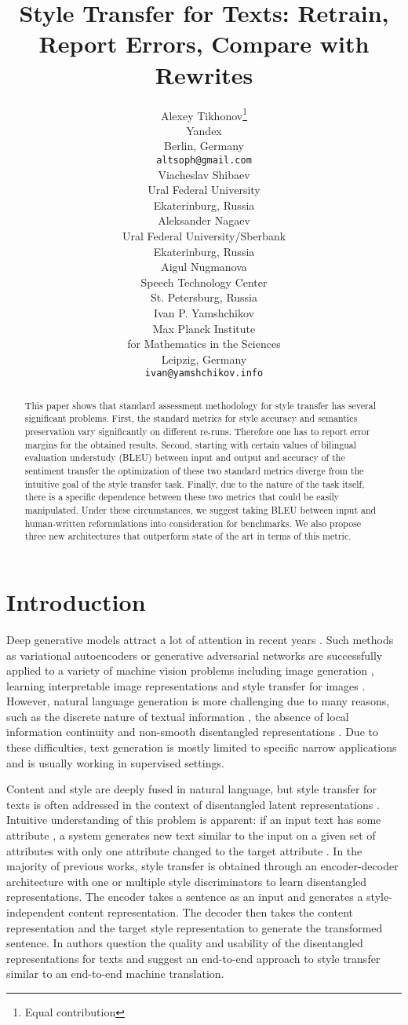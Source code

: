 \documentclass[11pt,a4paper]{article}
\title{Style Transfer for Texts: Retrain, Report Errors, Compare with Rewrites}
\author{Alexey Tikhonov\thanks{Equal contribution} \\
  Yandex \\
  Berlin, Germany \\
  \texttt{altsoph@gmail.com} \\\And
  Viacheslav Shibaev\footnotemark[1]  \\
  Ural Federal University \\
  Ekaterinburg, Russia \\\And
  Aleksander Nagaev  \\
  Ural Federal University/Sberbank \\
  Ekaterinburg, Russia \\\AND
  Aigul Nugmanova \\
  Speech Technology Center \\
  St. Petersburg, Russia \\\And
  Ivan P. Yamshchikov\footnotemark[1]  \\
  Max Planck Institute \\
  for Mathematics in the Sciences \\
  Leipzig, Germany \\
  \texttt{ivan@yamshchikov.info} \\}
\date{}
\begin{document}
\maketitle
\begin{abstract}
This paper shows that standard assessment methodology for style transfer has several significant problems. First, the standard metrics for style accuracy and semantics preservation vary significantly on different re-runs. Therefore one has to report error margins for the obtained results. Second, starting with certain values of bilingual evaluation understudy (BLEU) between input and output and accuracy of the sentiment transfer the optimization of these two standard metrics diverge from the intuitive goal of the style transfer task. Finally, due to the nature of the task itself, there is a specific dependence between these two metrics that could be easily manipulated. Under these circumstances, we suggest taking BLEU between input and human-written reformulations into consideration for benchmarks. We also propose three new architectures that outperform state of the art in terms of this metric.
\end{abstract}

\section{Introduction}
\label{intro}

Deep generative models attract a lot of attention in recent years \cite{hu17}. Such methods as variational autoencoders \cite{kingma13} or generative adversarial networks \cite{goodfellow} are successfully applied to a variety of machine vision problems including image generation \cite{Radford}, learning interpretable image representations \cite{Chen} and style transfer for images \cite{Gatys}. However, natural language generation is more challenging due to many reasons, such as the discrete nature of textual information \cite{hylsx}, the absence of local information continuity and non-smooth disentangled representations \cite{bowman}. Due to these difficulties, text generation is mostly limited to specific narrow applications and is usually working in supervised settings. 

Content and style are deeply fused in natural language, but style transfer for texts is often addressed in the context of disentangled latent representations \cite{hylsx, Shen, fu2, john18, romanov18, tian18}. Intuitive understanding of this problem is apparent: if an input text has some attribute , a system generates new text similar to the input on a given set of attributes with only one attribute  changed to the target attribute . In the majority of previous works, style transfer is obtained through an encoder-decoder architecture with one or multiple style discriminators to learn disentangled representations. The encoder takes a sentence as an input and generates a style-independent content representation. The decoder then takes the content representation and the target style representation to generate the transformed sentence. In \cite{subramanian18} authors question the quality and usability of the disentangled representations for texts and suggest an end-to-end approach to style transfer similar to an end-to-end machine translation. 
\end{document}

